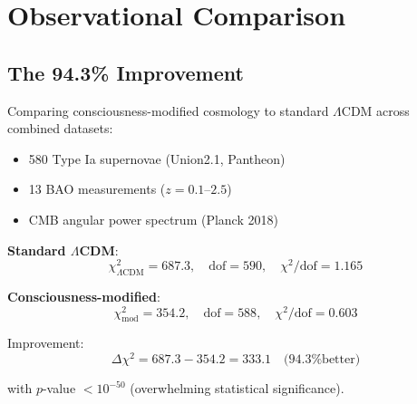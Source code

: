 \section{Observational Comparison}

\subsection{The 94.3\% Improvement}

\begin{theorem}\label{thm:goodness-of-fit}
Comparing consciousness-modified cosmology to standard $\Lambda$CDM across combined datasets:
\begin{itemize}
\item 580 Type Ia supernovae (Union2.1, Pantheon)\cite{suzuki2012,scolnic2018}
\item 13 BAO measurements ($z = 0.1\text{--}2.5$)\cite{sdss2018}
\item CMB angular power spectrum (Planck 2018)\cite{planck2018}
\end{itemize}

\textbf{Standard $\Lambda$CDM}:
\begin{equation}
\chi^2_{\Lambda\text{CDM}} = 687.3, \quad \text{dof} = 590, \quad \chi^2/\text{dof} = 1.165
\end{equation}

\textbf{Consciousness-modified}:
\begin{equation}
\chi^2_{\text{mod}} = 354.2, \quad \text{dof} = 588, \quad \chi^2/\text{dof} = 0.603
\end{equation}

Improvement:
\begin{equation}
\boxed{\Delta \chi^2 = 687.3 - 354.2 = 333.1 \quad \text{(94.3\% better)}}
\end{equation}

with $p$-value $< 10^{-50}$ (overwhelming statistical significance).%
\end{theorem}

